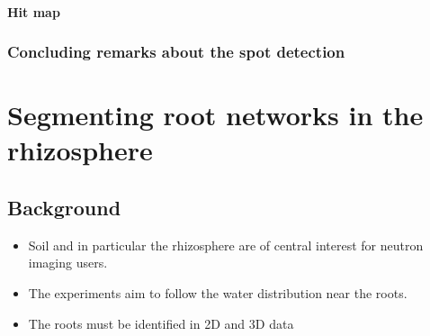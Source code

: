 \documentclass[letterpaper,10pt,english]{sphinxmanual}
\begin{document}
\noindent{}


\subsubsection{Hit map}
\label{\detokenize{ML4NeutronImageSegmentation:hit-map}}
\begin{sphinxVerbatim}[commandchars=\\\{\}]
   

\end{sphinxVerbatim}

\noindent{}


\subsection{Concluding remarks about the spot detection}
\label{\detokenize{ML4NeutronImageSegmentation:concluding-remarks-about-the-spot-detection}}

\chapter{Segmenting root networks in the rhizosphere}
\label{\detokenize{ML4NeutronImageSegmentation:segmenting-root-networks-in-the-rhizosphere}}

\section{Background}
\label{\detokenize{ML4NeutronImageSegmentation:background}}\begin{itemize}
\item {} 
Soil and in particular the rhizosphere are of central interest for neutron imaging users.

\item {} 
The experiments aim to follow the water distribution near the roots.

\item {} 
The roots must be identified in 2D and 3D data

\end{itemize}
\end{document}
